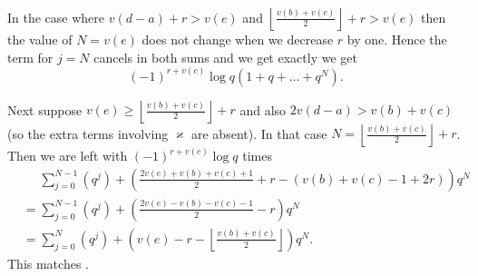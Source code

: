 \begin{itemize}
\ii In the case where $v(d-a)+r > v(e)$
and $\left\lfloor \frac{v(b)+v(c)}{2} \right\rfloor + r > v(e)$
then the value of $N = v(e)$ does not change when we decrease $r$ by one.
Hence the term for $j = N$ cancels in both sums and we get exactly
we get \[ (-1)^{r+v(c)} \log q (1 + q + \dots + q^N). \]

\ii Next suppose $v(e) \ge \left\lfloor \frac{v(b)+v(c)}{2} \right\rfloor + r$
and also $2v(d-a) > v(b) + v(c)$ (so the extra terms involving $\varkappa$ are absent).
In that case $N = \left\lfloor \frac{v(b) + v(c)}{2} \right\rfloor + r$.
Then we are left with $(-1)^{r+v(c)} \log q$ times
\begin{align*}
  &\phantom= \sum_{j=0}^{N-1} (q^j) + \left( \frac{2v(e)+v(b)+v(c)+1}{2} + r - (v(b)+v(c)-1+2r) \right) q^N \\
  &= \sum_{j=0}^{N-1} (q^j) + \left( \frac{2v(e)-v(b)-v(c)-1}{2} - r \right) q^N \\
  &= \sum_{j=0}^{N} (q^j) + \left( v(e) - r - \left\lfloor \frac{v(b)+v(c)}{2} \right\rfloor \right) q^N.
\end{align*}
This matches .


\end{itemize}
